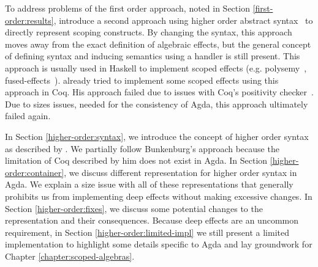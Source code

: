 
To address problems of the first order approach, noted in Section
\ref{first-order:results}, \citeauthor{DBLP:conf/haskell/WuSH14} introduce a
second approach using higher order abstract
syntax~\cite{DBLP:conf/haskell/WuSH14} to directly represent scoping
constructs.
By changing the syntax, this approach moves away from the exact definition of
algebraic effects, but the general concept of defining syntax and inducing
semantics using a handler is still present.
This approach is usually used in Haskell to implement scoped effects (e.g.
polysemy~\cite{SOFTWARE:polysemy}, fused-effects~\cite{SOFTWARE:fused-effects}).
\citeauthor{bunkenburg2019modeling} already tried to implement some scoped
effects using this approach in Coq.
His approach failed due to issues with Coq's positivity
checker~\cite{bunkenburg2019modeling}.
Due to sizes issues, needed for the consistency of Agda, this approach
ultimately failed again.

In Section \ref{higher-order:syntax}, we introduce the concept of higher order
syntax as described by \textcite{DBLP:conf/haskell/WuSH14}.
We partially follow Bunkenburg's approach because the limitation of Coq
described by him does not exist in Agda.
In Section \ref{higher-order:container}, we discuss different
representation for higher order syntax in Agda.
We explain a size issue with all of these representations that generally
prohibits us from implementing deep effects without making excessive changes.
In Section \ref{higher-order:fixes}, we discuss some potential changes to the
representation and their consequences.
Because deep effects are an uncommon requirement, in Section
\ref{higher-order:limited-impl} we still present a limited implementation
to highlight some details specific to Agda and lay groundwork for Chapter
\ref{chapter:scoped-algebras}.



